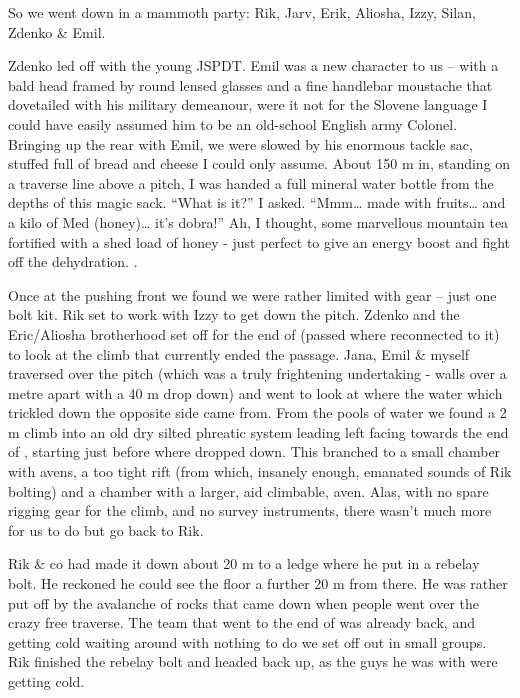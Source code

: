 So we went down in a mammoth party: Rik, Jarv, Erik, Aliosha, Izzy,
Silan, Zdenko \& Emil.

Zdenko led off with the young JSPDT. Emil was a new character to us --
with a bald head framed by round lensed glasses and a fine handlebar
moustache that dovetailed with his military demeanour, were it not for
the Slovene language I could have easily assumed him to be an old-school
English army Colonel. Bringing up the rear with Emil, we were slowed by
his enormous tackle sac, stuffed full of bread and cheese I could only
assume. About 150 m in, standing on a traverse line above a pitch, I was
handed a full mineral water bottle from the depths of this magic sack.
``What is it?'' I asked. ``Mmm\ldots{} made with fruits\ldots{} and a
kilo of Med (honey)\ldots{} it's dobra!'' Ah, I thought, some marvellous
mountain tea fortified with a shed load of honey - just perfect to give
an energy boost and fight off the dehydration. .

Once at the pushing front we found we were rather limited with gear --
just one bolt kit. Rik set to work with Izzy to get down the pitch.
Zdenko and the Eric/Aliosha brotherhood set off for the end of 
(passed where  reconnected to it) to look at the climb that
currently ended the passage. Jana, Emil \& myself traversed over the
pitch (which was a truly frightening undertaking - walls over a metre
apart with a 40 m drop down) and went to look at where the water which
trickled down the opposite side came from. From the pools of water we
found a 2 m climb into an old dry silted phreatic system leading left
facing towards the end of , starting just before where 
dropped down. This branched to a small chamber with avens, a too tight
rift (from which, insanely enough, emanated sounds of Rik bolting) and a
chamber with a larger, aid climbable, aven. Alas, with no spare rigging
gear for the climb, and no survey instruments, there wasn't much more
for us to do but go back to Rik.


Rik \& co had made it down about 20 m to a ledge where he put in a
rebelay bolt. He reckoned he could see the floor a further 20 m from
there. He was rather put off by the avalanche of rocks that came down
when people went over the crazy free traverse. The team that went to the
end of  was already back, and getting cold waiting around with
nothing to do we set off out in small groups. Rik finished the rebelay
bolt and headed back up, as the guys he was with were getting cold.

